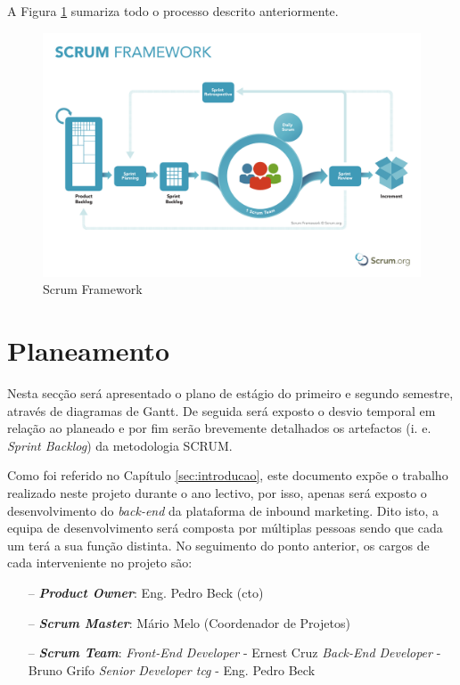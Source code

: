 A Figura \ref{fig:scrum} sumariza todo o processo descrito anteriormente.



\begin{figure}[ht!]
	\begin{center}
		\includegraphics[width=1\textwidth]{img/scrum.pdf}
		\caption{Scrum Framework\cite{scrumimg}}
		\label{fig:scrum}
	\end{center}
\end{figure}

\newpage

\section{Planeamento}
\label{planeamento}

Nesta secção será apresentado o plano de estágio do primeiro e segundo semestre, através de diagramas de Gantt.  De seguida será exposto o desvio temporal em relação ao planeado e por fim serão brevemente detalhados os artefactos (i. e. \textit{Sprint Backlog}) da metodologia SCRUM.

Como foi referido no Capítulo \ref{sec:introducao}, este documento expõe o trabalho realizado neste projeto durante o ano lectivo, por isso, apenas será exposto o desenvolvimento do \textit{back-end} da plataforma de inbound marketing. Dito isto, a equipa de desenvolvimento será composta por múltiplas pessoas sendo que cada um terá a sua função distinta.
No seguimento do ponto anterior, os cargos de cada interveniente no projeto são:
\begin{itemize}
	\item[--] \textbf{\textit{Product Owner}}: Eng. Pedro Beck (\acrfull{cto})
	\item[--] \textbf{\textit{Scrum Master}}: Mário Melo (Coordenador de Projetos)
	\item[--] \textbf{\textit{Scrum Team}}: 
	\subitem  \textit{Front-End Developer} - Ernest Cruz
	\subitem  \textit{Back-End Developer} - Bruno Grifo
	\subitem  \textit{Senior Developer \acrshort{tcg}} - Eng. Pedro Beck
\end{itemize}

